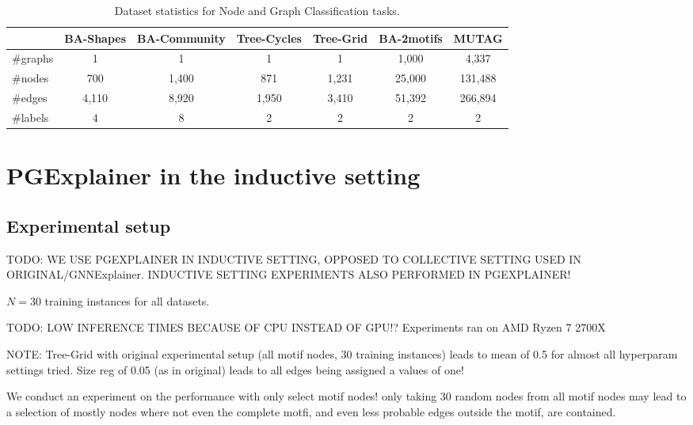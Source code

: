 \begin{table}[h]
    \centering
    \scriptsize
    \begin{tabular}{l|cccc|cc}
    \hline
    \textbf{} & \textbf{BA-Shapes} & \textbf{BA-Community} & \textbf{Tree-Cycles} & \textbf{Tree-Grid} & \textbf{BA-2motifs} & \textbf{MUTAG} \\
    \hline
    \#graphs & 1 & 1 & 1 & 1 & 1,000 & 4,337 \\
    \#nodes  & 700 & 1,400 & 871 & 1,231 & 25,000 & 131,488 \\
    \#edges  & 4,110 & 8,920 & 1,950 & 3,410 & 51,392 & 266,894 \\
    \#labels & 4 & 8 & 2 & 2 & 2 & 2 \\
    \hline
    \end{tabular}
    \caption{Dataset statistics for Node and Graph Classification tasks.}
    \label{tab:dataset-statistics}
    \end{table}

\bigskip

\section{PGExplainer in the inductive setting}

\subsection{Experimental setup}


TODO: WE USE PGEXPLAINER IN INDUCTIVE SETTING, OPPOSED TO COLLECTIVE SETTING USED IN ORIGINAL/GNNExplainer. INDUCTIVE SETTING EXPERIMENTS ALSO PERFORMED IN PGEXPLAINER!

$N=30$ training instances for all datasets.

TODO: LOW INFERENCE TIMES BECAUSE OF CPU INSTEAD OF GPU!?
Experiments ran on AMD Ryzen 7 2700X


NOTE: Tree-Grid with original experimental setup (all motif nodes, 30 training instances) leads to mean of 0.5 for almost all hyperparam settings tried. Size reg of 0.05 (as in original) leads to all edges being assigned a values of one!

We conduct an experiment on the performance with only select motif nodes! only taking 30 random nodes from all motif nodes may lead to a selection of mostly nodes where not even the complete motfi, and even less probable edges outside the motif, are contained.

